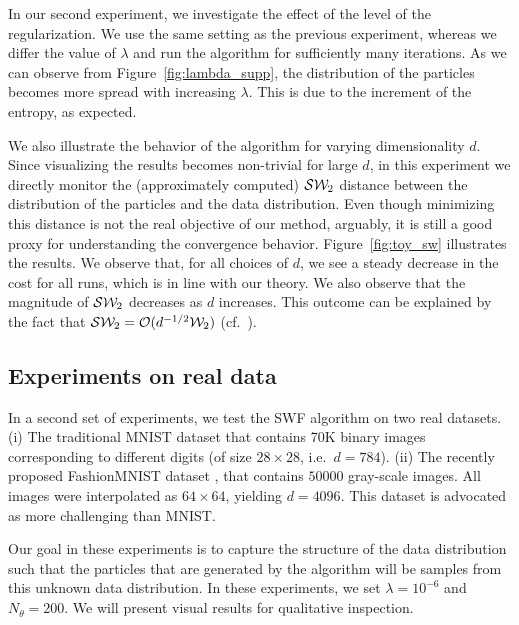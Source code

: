 In our second experiment, we investigate the effect of the level of the regularization. We use the same setting as the previous experiment, whereas we differ the value of $\lambda$ and run the algorithm for sufficiently many iterations. As we can observe from Figure~\ref{fig:lambda_supp}, the distribution of the particles becomes more spread with increasing $\lambda$. This is due to the increment of the entropy, as expected.



We also illustrate the behavior of the algorithm for varying dimensionality $d$. Since visualizing the results becomes non-trivial for large $d$, in this experiment we directly monitor the (approximately computed) ${\cal S}{\cal W}_2$ distance between the distribution of the particles and the data distribution. Even though minimizing this distance is not the real objective of our method, arguably, it is still a good proxy for understanding the convergence behavior.
%
Figure~\ref{fig:toy_sw} illustrates the results. We observe that, for all choices of $d$, we see a steady decrease in the cost for all runs, which is in line with our theory. We also observe that the magnitude of ${\cal S}{\cal W}_2$ decreases as $d$ increases. This outcome can be explained by the fact that ${\cal S}{\cal W}_2 = {\cal O}(d^{-1/2}{\cal W}_2)$ (cf.\ \cite{bonnotte2013unidimensional}).






\subsection{Experiments on real data}

%
In a second set of experiments, we test the SWF algorithm on two real datasets. (i) The traditional MNIST dataset that contains 70K binary images corresponding to different digits (of size $28 \times 28$, i.e.\ $d = 784$). (ii) The recently proposed FashionMNIST dataset \cite{xiao2017fashion}, that contains $50000$ gray-scale images. All images were interpolated as $64\times 64$, yielding $d=4096$. This dataset is advocated as more challenging than MNIST.

Our goal in these experiments is to capture the structure of the data distribution such that the particles that are generated by the algorithm will be samples from this unknown data distribution. In these experiments, we set $\lambda=10^{-6}$ and $N_\theta=200$. We will present visual results for qualitative inspection. %


